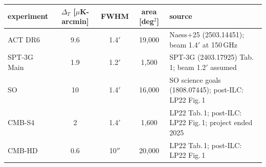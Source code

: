 \begin{tabular}{lcccl}
\toprule
experiment & $\Delta_T$ [$\mu$K-arcmin] & FWHM & area [deg$^2$] & source \\
\midrule
ACT DR6 & 9.6 & 1.4$'$ & 19,000 & Naess+25 (2503.14451); beam 1.4$'$ at 150\,GHz \\
SPT-3G Main & 1.9 & 1.2$'$ & 1,500 & SPT-3G (2403.17925) Tab.\,1; beam 1.2$'$ assumed \\
SO & 10 & 1.4$'$ & 16,000 & SO science goals (1808.07445); post-ILC: LP22 Fig.\,1 \\
CMB-S4 & 2 & 1.4$'$ & 1,600 & LP22 Tab.\,1; post-ILC: LP22 Fig.\,1; project ended 2025 \\
CMB-HD & 0.6 & 10$''$ & 20,000 & LP22 Tab.\,1; post-ILC: LP22 Fig.\,1 \\
\bottomrule
\end{tabular}
